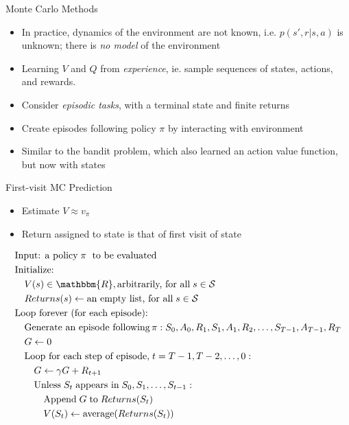 \documentclass[ignorenonframetext,xcolor=x11names]{beamer}
\begin{document}
\begin{frame}{Monte Carlo Methods}
\begin{itemize}
   \item In practice, dynamics of the environment are not known, i.e. $p(s', r | s, a)$ is unknown; there is \emph{no model} of the environment
   \item Learning $V$ and $Q$ from \emph{experience}, ie. sample sequences of states, actions, and rewards. 
   \item Consider \emph{episodic tasks}, with a terminal state and finite returns
   \item Create episodes following policy $\pi$ by interacting with environment
   \item Similar to the bandit problem, which also learned an action value function, but now with states
\end{itemize}
\end{frame}

\begin{frame}{First-visit MC Prediction}
\begin{itemize}
   \item Estimate $V \approx v_{\pi}$
   \item Return assigned to state is that of first visit of state
\end{itemize}

\begin{block}{}
\footnotesize
\begin{align*}
& \text{Input: a policy}\;\pi\;\text{ to be evaluated} \\
& \text{Initialize:} \\
& \quad V(s) \in \mathbbm{R}, \text{arbitrarily, for all}\;s \in \mathcal{S} \\
& \quad Returns(s) \leftarrow \text{an empty list, for all}\; s \in \mathcal{S} \\
& \text{Loop forever (for each episode):}\\
& \quad \text{Generate an episode following}\, \pi: S_0, A_0, R_1, S_1, A_1, R_2, \ldots, S_{T-1}, A_{T-1}, R_{T} \\
& \quad G \leftarrow 0 \\
& \quad \text{Loop for each step of episode,}\; t = T-1, T-2, \ldots, 0: \\
& \quad \quad G \leftarrow \gamma G + R_{t+1} \\
& \quad \quad \text{Unless}\; S_t\; \text{appears in}\; S_0, S_1, \ldots, S_{t-1}: \\
& \quad \quad \quad \text{Append}\; G\; \text{to}\; Returns(S_t) \\
& \quad \quad \quad V(S_t) \leftarrow \operatorname{average}(Returns(S_t))
\end{align*}
\end{block}
\end{frame}
\end{document}

